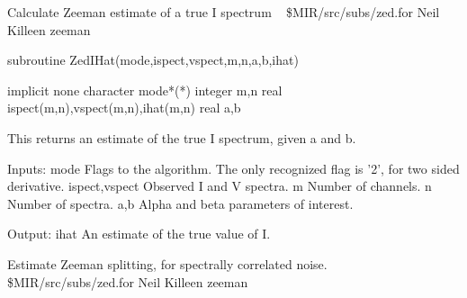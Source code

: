 %
\noindent Calculate Zeeman estimate of a true I spectrum
\newline \ 
\newline {} \$MIR/src/subs/zed.for
\newline {} Neil Killeen
\newline {} zeeman
\par{\tenpoint
{\eightpoint\begintt
        subroutine ZedIHat(mode,ispect,vspect,m,n,a,b,ihat)

        implicit none
        character mode*(*)
        integer m,n
        real ispect(m,n),vspect(m,n),ihat(m,n)
        real a,b

  This returns an estimate of the true I spectrum, given a and b.

  Inputs:
    mode       Flags to the algorithm. The only recognized flag is '2',
               for two sided derivative.
    ispect,vspect Observed I and V spectra.
    m          Number of channels.
    n          Number of spectra.
    a,b        Alpha and beta parameters of interest.

  Output:
    ihat       An estimate of the true value of I.
\endtt}
\par}
%
\noindent Estimate Zeeman splitting, for spectrally correlated noise.
\newline \ 
\newline \abox{File:} \$MIR/src/subs/zed.for
\newline {} Neil Killeen
\newline \abox{Keywords:} zeeman
